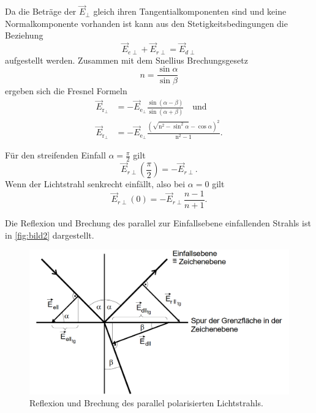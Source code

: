 Da die Beträge der $\vec{E}_{\perp}$ gleich ihren Tangentialkomponenten sind und keine Normalkomponente vorhanden ist kann aus den
Stetigkeitsbedingungen die Beziehung 
\begin{equation*}
    \vec{E}_{e\perp} + \vec{E}_{r \perp} = \vec{E}_{d\perp}
\end{equation*}
aufgestellt werden.  
Zusammen mit dem Snellius Brechungsgesetz
\begin{equation}
    n = \frac{\sin \alpha}{\sin \beta}
    \label{eqn:snellius}
\end{equation}
ergeben sich die Fresnel Formeln
\begin{equation}
    \begin{aligned}
    \vec{E}_{\mathrm{r}_{\perp}}&=-\vec{E}_{\mathrm{e}_{\perp}} \frac{\sin (\alpha-\beta)}{\sin (\alpha+\beta)} \quad \text{und}\\
    \vec{E}_{\mathrm{r}_{\perp}}&=-\vec{E}_{\mathrm{e}_{\perp}} \frac{\left(\sqrt{\mathrm{n}^2-\sin ^2 \alpha}-\cos \alpha\right)^2}{\mathrm{n}^2-1} .
    \label{eqn:fresnel1}
    \end{aligned}
\end{equation}

Für den streifenden Einfall $\alpha = \frac{\pi}{2}$ gilt
\begin{equation*}
    \vec{E}_{r\perp}(\frac{\pi}{2}) = - \vec{E}_{r\perp}.
\end{equation*}
Wenn der Lichtstrahl senkrecht einfällt, also bei $\alpha = 0$ gilt
\begin{equation*}
    \vec{E}_{r\perp}(0) = - \vec{E}_{r\perp}\frac{n - 1}{n + 1}.
\end{equation*}


Die Reflexion und Brechung des parallel zur Einfallsebene einfallenden Strahls ist in \autoref{fig:bild2} dargestellt.

\begin{figure}[H]
	\centering
	\includegraphics[width=0.9\linewidth]{content/grafik/bild2.png}
	\caption{Reflexion und Brechung des parallel polarisierten Lichtstrahls. \cite{fresnel}}
	\label{fig:bild2}
\end{figure}

